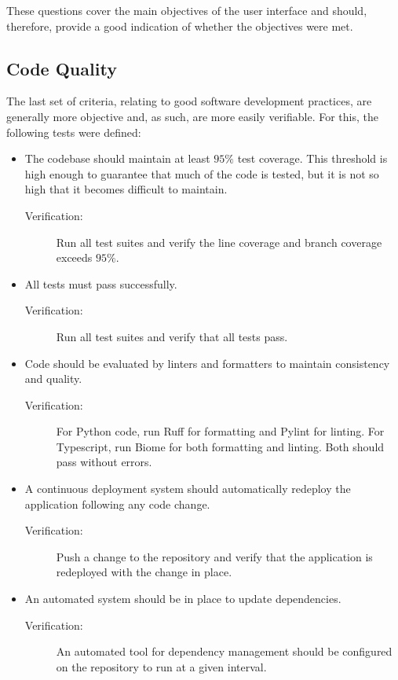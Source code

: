 These questions cover the main objectives of the user interface and should, therefore, provide a good indication of whether the objectives were met.

\subsection{Code Quality}
The last set of criteria, relating to good software development practices, are generally more objective and, as such, are more easily verifiable. For this, the following tests were defined:
\begin{itemize}
    \item The codebase should maintain at least $95\%$ test coverage. This threshold is high enough to guarantee that much of the code is tested, but it is not so high that it becomes difficult to maintain.
    \begin{description}
        \item[Verification:] Run all test suites and verify the line coverage and branch coverage exceeds $95\%.$
    \end{description}
    \item All tests must pass successfully.
    \begin{description}
        \item[Verification:] Run all test suites and verify that all tests pass.
    \end{description}
    \item Code should be evaluated by linters and formatters to maintain consistency and quality.
    \begin{description}
        \item[Verification:] For Python code, run Ruff for formatting and Pylint for linting. For Typescript, run Biome for both formatting and linting. Both should pass without errors.
    \end{description}
    \item A continuous deployment system should automatically redeploy the application following any code change.
    \begin{description}
        \item[Verification:] Push a change to the repository and verify that the application is redeployed with the change in place.
    \end{description}
    \item An automated system should be in place to update dependencies.
    \begin{description}
        \item[Verification:] An automated tool for dependency management should be configured on the repository to run at a given interval.
    \end{description}
\end{itemize}

